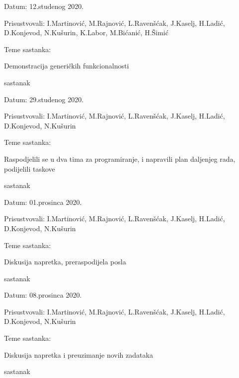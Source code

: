 \begin{packed_enum}
	\item[] \begin{packed_item}
		\item Datum: 12.studenog 2020.
		\item Prisustvovali: I.Martinović, M.Rajnović, L.Ravenšćak, J.Kaselj, H.Ladić, D.Konjevod, N.Kušurin, K.Labor, M.Bićanić, H.Šimić
		\item Teme sastanka: 
		\begin{packed_item}
			\item   Demonstracija generičkih funkcionalnosti
		\end{packed_item}
	\end{packed_item}
		            \item sastanak
		\item[] \begin{packed_item}
			\item Datum: 29.studenog 2020.
			\item Prisustvovali: I.Martinović, M.Rajnović, L.Ravenšćak, J.Kaselj, H.Ladić, D.Konjevod, N.Kušurin
			\item Teme sastanka: 
			\begin{packed_item}
				\item   Raspodjelili se u dva tima za programiranje, i napravili plan daljenjeg rada, podijelili taskove
			\end{packed_item}
		\end{packed_item}
	
		            \item sastanak
		            
		\item[] \begin{packed_item}
			\item Datum: 01.prosinca 2020.
			\item Prisustvovali: I.Martinović, M.Rajnović, L.Ravenšćak, J.Kaselj, H.Ladić, D.Konjevod, N.Kušurin
			\item Teme sastanka: 
			\begin{packed_item}
				\item   Diskusija napretka, preraspodijela posla
			\end{packed_item}
		\end{packed_item}
			\item sastanak
			
			\item[] \begin{packed_item}
			\item Datum: 08.prosinca 2020.
			\item Prisustvovali: I.Martinović, M.Rajnović, L.Ravenšćak, J.Kaselj, H.Ladić, D.Konjevod, N.Kušurin
			\item Teme sastanka: 
			\begin{packed_item}
				\item   Diskusija napretka i preuzimanje novih zadataka
			\end{packed_item}
		\end{packed_item}
			\item sastanak
			

\end{packed_enum}

